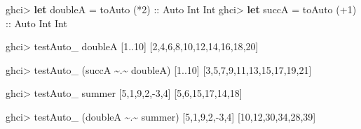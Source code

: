 \documentclass[]{article}
\newenvironment{Shaded}{}{}
\newcommand{\DataTypeTok}[1]{\textcolor[rgb]{0.56,0.13,0.00}{#1}}
\newcommand{\DecValTok}[1]{\textcolor[rgb]{0.25,0.63,0.44}{#1}}
\newcommand{\KeywordTok}[1]{\textcolor[rgb]{0.00,0.44,0.13}{\textbf{#1}}}
\newcommand{\NormalTok}[1]{#1}
\newcommand{\OperatorTok}[1]{\textcolor[rgb]{0.40,0.40,0.40}{#1}}
\newcommand{\OtherTok}[1]{\textcolor[rgb]{0.00,0.44,0.13}{#1}}
\begin{document}
\begin{Shaded}
\begin{Highlighting}[]
\NormalTok{ghci}\OperatorTok{\textgreater{}} \KeywordTok{let}\NormalTok{ doubleA  }\OtherTok{=}\NormalTok{ toAuto (}\OperatorTok{*}\DecValTok{2}\NormalTok{)}\OtherTok{      ::} \DataTypeTok{Auto} \DataTypeTok{Int} \DataTypeTok{Int}
\NormalTok{ghci}\OperatorTok{\textgreater{}} \KeywordTok{let}\NormalTok{ succA    }\OtherTok{=}\NormalTok{ toAuto (}\OperatorTok{+}\DecValTok{1}\NormalTok{)}\OtherTok{      ::} \DataTypeTok{Auto} \DataTypeTok{Int} \DataTypeTok{Int}

\NormalTok{ghci}\OperatorTok{\textgreater{}}\NormalTok{ testAuto\_ doubleA [}\DecValTok{1}\OperatorTok{..}\DecValTok{10}\NormalTok{]}
\NormalTok{[}\DecValTok{2}\NormalTok{,}\DecValTok{4}\NormalTok{,}\DecValTok{6}\NormalTok{,}\DecValTok{8}\NormalTok{,}\DecValTok{10}\NormalTok{,}\DecValTok{12}\NormalTok{,}\DecValTok{14}\NormalTok{,}\DecValTok{16}\NormalTok{,}\DecValTok{18}\NormalTok{,}\DecValTok{20}\NormalTok{]}

\NormalTok{ghci}\OperatorTok{\textgreater{}}\NormalTok{ testAuto\_ (succA }\OperatorTok{\textasciitilde{}.\textasciitilde{}}\NormalTok{ doubleA) [}\DecValTok{1}\OperatorTok{..}\DecValTok{10}\NormalTok{]}
\NormalTok{[}\DecValTok{3}\NormalTok{,}\DecValTok{5}\NormalTok{,}\DecValTok{7}\NormalTok{,}\DecValTok{9}\NormalTok{,}\DecValTok{11}\NormalTok{,}\DecValTok{13}\NormalTok{,}\DecValTok{15}\NormalTok{,}\DecValTok{17}\NormalTok{,}\DecValTok{19}\NormalTok{,}\DecValTok{21}\NormalTok{]}

\NormalTok{ghci}\OperatorTok{\textgreater{}}\NormalTok{ testAuto\_ summer [}\DecValTok{5}\NormalTok{,}\DecValTok{1}\NormalTok{,}\DecValTok{9}\NormalTok{,}\DecValTok{2}\NormalTok{,}\OperatorTok{{-}}\DecValTok{3}\NormalTok{,}\DecValTok{4}\NormalTok{]}
\NormalTok{[}\DecValTok{5}\NormalTok{,}\DecValTok{6}\NormalTok{,}\DecValTok{15}\NormalTok{,}\DecValTok{17}\NormalTok{,}\DecValTok{14}\NormalTok{,}\DecValTok{18}\NormalTok{]}

\NormalTok{ghci}\OperatorTok{\textgreater{}}\NormalTok{ testAuto\_ (doubleA }\OperatorTok{\textasciitilde{}.\textasciitilde{}}\NormalTok{ summer) [}\DecValTok{5}\NormalTok{,}\DecValTok{1}\NormalTok{,}\DecValTok{9}\NormalTok{,}\DecValTok{2}\NormalTok{,}\OperatorTok{{-}}\DecValTok{3}\NormalTok{,}\DecValTok{4}\NormalTok{]}
\NormalTok{[}\DecValTok{10}\NormalTok{,}\DecValTok{12}\NormalTok{,}\DecValTok{30}\NormalTok{,}\DecValTok{34}\NormalTok{,}\DecValTok{28}\NormalTok{,}\DecValTok{39}\NormalTok{]}


\end{Highlighting}
\end{Shaded}
\end{document}
